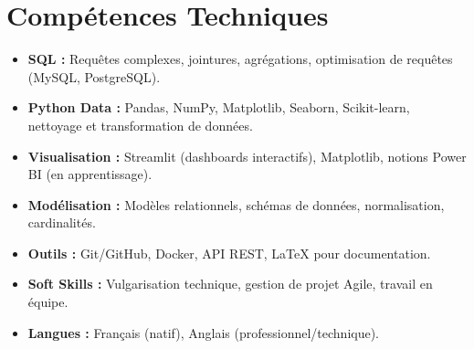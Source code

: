 \documentclass[a4paper,11pt]{article}
\begin{document}
\section{Compétences Techniques}
\begin{itemize}[leftmargin=*, nosep]
    \item \small{\textbf{SQL :} Requêtes complexes, jointures, agrégations, optimisation de requêtes (MySQL, PostgreSQL).}
    \item \small{\textbf{Python Data :} Pandas, NumPy, Matplotlib, Seaborn, Scikit-learn, nettoyage et transformation de données.}
    \item \small{\textbf{Visualisation :} Streamlit (dashboards interactifs), Matplotlib, notions Power BI (en apprentissage).}
    \item \small{\textbf{Modélisation :} Modèles relationnels, schémas de données, normalisation, cardinalités.}
    \item \small{\textbf{Outils :} Git/GitHub, Docker, API REST, LaTeX pour documentation.}
    \item \small{\textbf{Soft Skills :} Vulgarisation technique, gestion de projet Agile, travail en équipe.}
    \item \small{\textbf{Langues :} Français (natif), Anglais (professionnel/technique).}
\end{itemize}

\end{document}
